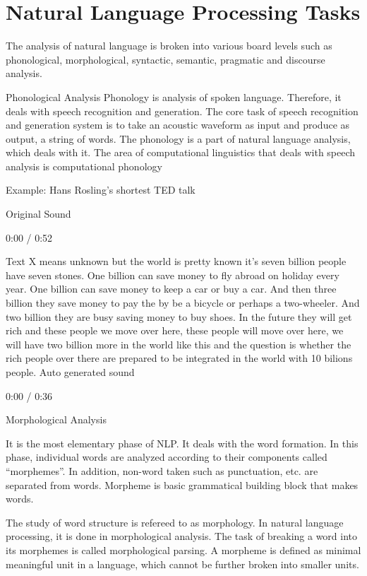 \section{Natural Language Processing Tasks}

The analysis of natural language is broken into various board levels such as phonological, morphological, syntactic, semantic, pragmatic and discourse analysis.


Phonological Analysis
Phonology is analysis of spoken language. Therefore, it deals with speech recognition and generation. The core task of speech recognition and generation system is to take an acoustic waveform as input and produce as output, a string of words. The phonology is a part of natural language analysis, which deals with it. The area of computational linguistics that deals with speech analysis is computational phonology

Example: Hans Rosling’s shortest TED talk

Original Sound

0:00
/ 0:52


Text X means unknown but the world is pretty known it’s seven billion people have seven stones. One billion can save money to fly abroad on holiday every year. One billion can save money to keep a car or buy a car. And then three billion they save money to pay the by be a bicycle or perhaps a two-wheeler. And two billion they are busy saving money to buy shoes. In the future they will get rich and these people we move over here, these people will move over here, we will have two billion more in the world like this and the question is whether the rich people over there are prepared to be integrated in the world with 10 bilions people.
Auto generated sound

0:00
/ 0:36


Morphological Analysis

It is the most elementary phase of NLP. It deals with the word formation. In this phase, individual words are analyzed according to their components called “morphemes”. In addition, non-word taken such as punctuation, etc. are separated from words. Morpheme is basic grammatical building block that makes words.


The study of word structure is refereed to as morphology. In natural language processing, it is done in morphological analysis. The task of breaking a word into its morphemes is called morphological parsing. A morpheme is defined as minimal meaningful unit in a language, which cannot be further broken into smaller units.

